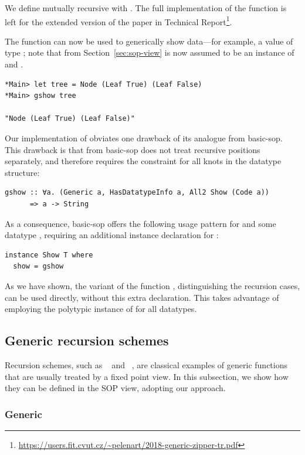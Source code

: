 \documentclass[sigplan,screen,review,anonymous]{acmart}
\begin{document}
We define  mutually recursive with . The full implementation of the function  is left for the extended version of the paper in Technical Report\footnote{\url{https://users.fit.cvut.cz/~pelenart/2018-generic-zipper-tr.pdf}}.

The function  can now be used to generically show data---for example, a value of type ; note that  from Section~\ref{sec:sop-view} is now assumed to be an instance of  and .
\begin{lstlisting}[style=ttstyle]
*Main> let tree = Node (Leaf True) (Leaf False)
*Main> gshow tree

"Node (Leaf True) (Leaf False)"
\end{lstlisting}

Our implementation of  obviates one drawback of its analogue from \textsf{basic-sop}. This drawback is that  from \textsf{basic-sop} does not treat recursive positions separately, and therefore requires the  constraint for all knots in the datatype structure:
\begin{lstlisting}[style=fancy]
gshow :: ∀a. (Generic a, HasDatatypeInfo a, All2 Show (Code a))
      => a -> String
\end{lstlisting}
As a consequence, \textsf{basic-sop} offers the following usage pattern for  and some datatype , requiring an additional  instance declaration for :
\begin{lstlisting}[style=fancy]
instance Show T where
  show = gshow
\end{lstlisting}
As we have shown,  the variant of the function , distinguishing the recursion cases, can be used directly, without this extra declaration. This takes advantage of employing the polytypic instance of  for all datatypes.


\subsection{Generic recursion schemes}
\label{subsec:rec-schemes}


Recursion schemes, such as ~\cite{Meijer1991,MuRec2009} and ~\cite{Bringert2006}, are classical examples of generic functions that are usually treated by a fixed point view. In this subsection, we show how they can be defined in the SOP view, adopting our approach.

\subsubsection{Generic }
\end{document}

